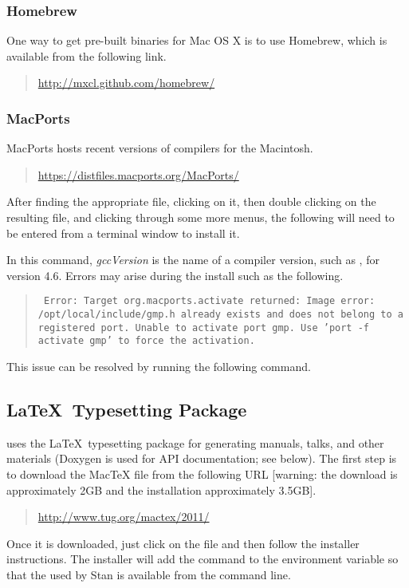 \subsubsection{Homebrew}

One way to get pre-built binaries for Mac OS X is to use Homebrew,
which is available from the following link.
\begin{quote}
\url{http://mxcl.github.com/homebrew/}
\end{quote}

\subsubsection{MacPorts}

MacPorts hosts recent versions of compilers for the Macintosh.
%
\begin{quote}
\url{https://distfiles.macports.org/MacPorts/}
\end{quote}
%
After finding the appropriate  file, clicking on it, then
double clicking on the resulting  file, and clicking
through some more menus, the following will need to be entered from a
terminal window to install it.
%
\begin{quote}
\end{quote}
%
In this command, {\slshape gccVersion} is the name of a compiler
version, such as , for version 4.6.  Errors may arise
during the install such as the following.
%
\begin{quote}\small\tt
  Error: Target org.macports.activate returned: Image error:
  /opt/local/include/gmp.h already exists and does not belong to a
  registered port.  Unable to activate port gmp. Use 'port -f activate
  gmp' to force the activation.
\end{quote}
%
This issue can be resolved by running the following command.
%
\begin{quote}
\end{quote}
%

\subsection{\LaTeX\ Typesetting Package}

\CmdStan uses the \LaTeX\ typesetting package for generating manuals,
talks, and other materials (Doxygen is used for API documentation; see
below).  The first step is to download the MacTeX  file
from the following URL [warning: the download is approximately 2GB and
the installation approximately 3.5GB].
%
\begin{quote}
\url{http://www.tug.org/mactex/2011/}
\end{quote}
%
Once it is downloaded, just click on the  file and then
follow the installer instructions.  The installer will add the command
to the  environment variable so that the 
used by Stan is available from the command line.


